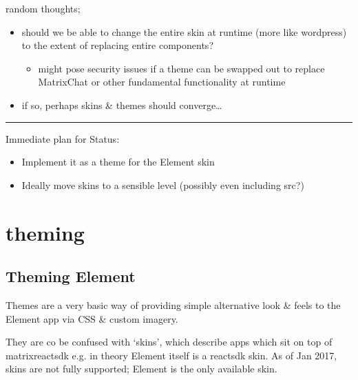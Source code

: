 \documentclass[letterpaper,10pt,openany,oneside,english]{sphinxmanual}
\begin{document}
\sphinxAtStartPar
random thoughts;
\begin{itemize}
\item {} 
\sphinxAtStartPar
should we be able to change the entire skin at runtime (more like wordpress) \sphinxhyphen{} to the extent of replacing entire components?
\begin{itemize}
\item {} 
\sphinxAtStartPar
might pose security issues if a theme can be swapped out to replace MatrixChat or other fundamental functionality at runtime

\end{itemize}

\item {} 
\sphinxAtStartPar
if so, perhaps skins \& themes should converge…

\end{itemize}


\bigskip\hrule\bigskip


\sphinxAtStartPar
Immediate plan for Status:
\begin{itemize}
\item {} 
\sphinxAtStartPar
Implement it as a theme for the Element skin

\item {} 
\sphinxAtStartPar
Ideally move skins to a sensible level (possibly even including src?)

\end{itemize}


\chapter{theming}
\label{\detokenize{theming:theming}}\label{\detokenize{theming::doc}}

\section{Theming Element}
\label{\detokenize{theming:theming-element}}
\sphinxAtStartPar
Themes are a very basic way of providing simple alternative look \& feels to the
Element app via CSS \& custom imagery.

\sphinxAtStartPar
They are  co be confused with ‘skins’, which describe apps which sit on top
of matrix\sphinxhyphen{}react\sphinxhyphen{}sdk \sphinxhyphen{} e.g. in theory Element itself is a react\sphinxhyphen{}sdk skin.
As of Jan 2017, skins are not fully supported; Element is the only available skin.
\end{document}
